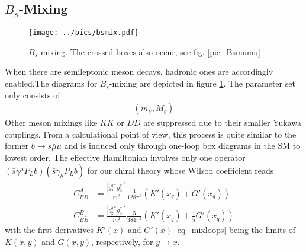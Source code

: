 \subsection{$B_s$-Mixing}
\begin{figure}[t]
 \texttt{[image: ../pics/bsmix.pdf]}
 \caption{$B_s$-mixing. The crossed boxes also occur, see fig. \ref{pic_Bsmumu}}
 \label{pic_Bsmix}
\end{figure}
When there are semileptonic meson decays, hadronic ones are accordingly enabled.The diagrams for $B_s$-mixing are depicted in figure \ref{pic_Bsmix}. 
The parameter set only consists of
\begin{align}
 \left(m_\chi,M_q\right)
\end{align}
Other
meson mixings like $K\bar K$ or $ D \bar D$ are suppressed due to their smaller Yukawa couplings. From a calculational point of view, this process is 
quite similar to the former $b\rightarrow s\bar\mu\mu$ and is induced only through one-loop box diagrams in the SM to lowest order. The effective Hamiltonian
involves only one operator $(\bar s \gamma^\mu P_L b)(\bar s \gamma_\mu P_L b)$ for our chiral theory whose Wilson coefficient reads
\begin{align}
 C_{B\bar B}^A &=  \frac{|g_2^{q*}g_3^q|^2}{m^2} \frac{1}{128\pi^2} \left(K'(x_q) + G'(x_q)\right)\\
 C_{B\bar B}^B &=  \frac{|g_2^{q*}g_3^q|^2}{m^2} \frac{5}{384\pi^2} \left(K'(x_q) + \frac15 G'(x_q)\right)
 \label{eq_WilsonMix}
\end{align}
with the first derivatives $K'(x)$ and $G'(x)$ \eqref{eq_mixloops} being the limits of $K(x,y)$ and $G(x,y)$, respectively, for $y\rightarrow x$. 

